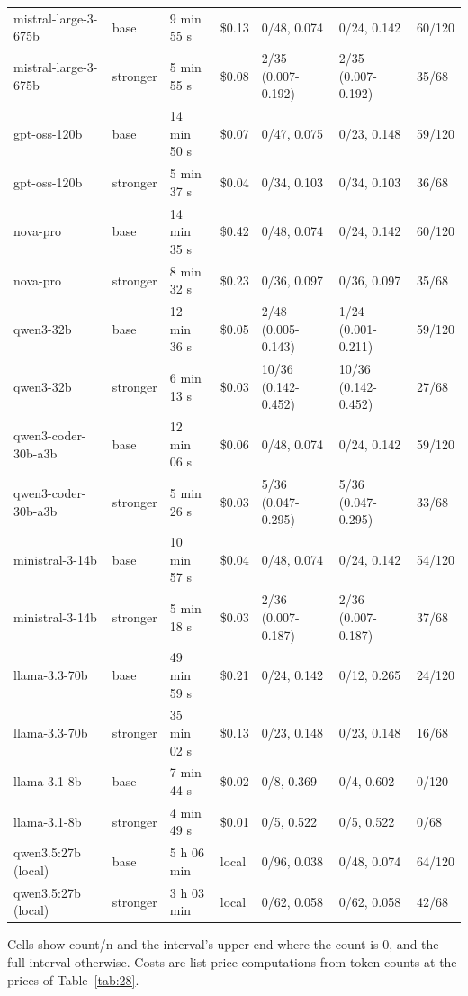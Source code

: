 \documentclass[11pt]{article}
\begin{document}
\begin{table}[!htb]
\begin{tabularx}{\linewidth}{@{}YlllYYl@{}}
mistral-large-3-675b & base & 9 min 55 s & \$0.13 & 0/48, 0.074 & 0/24, 0.142 & 60/120 \\
mistral-large-3-675b & stronger & 5 min 55 s & \$0.08 & 2/35 (0.007-0.192) & 2/35 (0.007-0.192) & 35/68 \\
gpt-oss-120b & base & 14 min 50 s & \$0.07 & 0/47, 0.075 & 0/23, 0.148 & 59/120 \\
gpt-oss-120b & stronger & 5 min 37 s & \$0.04 & 0/34, 0.103 & 0/34, 0.103 & 36/68 \\
nova-pro & base & 14 min 35 s & \$0.42 & 0/48, 0.074 & 0/24, 0.142 & 60/120 \\
nova-pro & stronger & 8 min 32 s & \$0.23 & 0/36, 0.097 & 0/36, 0.097 & 35/68 \\
qwen3-32b & base & 12 min 36 s & \$0.05 & 2/48 (0.005-0.143) & 1/24 (0.001-0.211) & 59/120 \\
qwen3-32b & stronger & 6 min 13 s & \$0.03 & 10/36 (0.142-0.452) & 10/36 (0.142-0.452) & 27/68 \\
qwen3-coder-30b-a3b & base & 12 min 06 s & \$0.06 & 0/48, 0.074 & 0/24, 0.142 & 59/120 \\
qwen3-coder-30b-a3b & stronger & 5 min 26 s & \$0.03 & 5/36 (0.047-0.295) & 5/36 (0.047-0.295) & 33/68 \\
ministral-3-14b & base & 10 min 57 s & \$0.04 & 0/48, 0.074 & 0/24, 0.142 & 54/120 \\
ministral-3-14b & stronger & 5 min 18 s & \$0.03 & 2/36 (0.007-0.187) & 2/36 (0.007-0.187) & 37/68 \\
llama-3.3-70b & base & 49 min 59 s & \$0.21 & 0/24, 0.142 & 0/12, 0.265 & 24/120 \\
llama-3.3-70b & stronger & 35 min 02 s & \$0.13 & 0/23, 0.148 & 0/23, 0.148 & 16/68 \\
llama-3.1-8b & base & 7 min 44 s & \$0.02 & 0/8, 0.369 & 0/4, 0.602 & 0/120 \\
llama-3.1-8b & stronger & 4 min 49 s & \$0.01 & 0/5, 0.522 & 0/5, 0.522 & 0/68 \\
qwen3.5:27b (local) & base & 5 h 06 min & local & 0/96, 0.038 & 0/48, 0.074 & 64/120 \\
qwen3.5:27b (local) & stronger & 3 h 03 min & local & 0/62, 0.058 & 0/62, 0.058 & 42/68 \\
\bottomrule
\end{tabularx}
\end{table}

Cells show count/n and the interval's upper end where the count is 0, and the full interval otherwise. Costs are list-price computations from token counts at the prices of Table~\ref{tab:28}.
\end{document}
